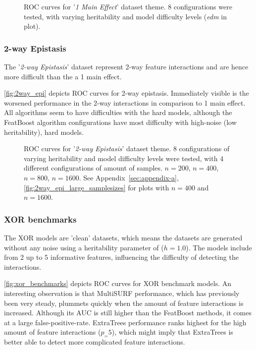 \documentclass{article}
\begin{document}
\begin{figure}[ht]
\centering

\caption{ROC curves for '\textit{1 Main Effect}' dataset theme. 8 configurations were tested, with varying heritability and model difficulty levels (\textit{edm} in plot).}
\label{fig:1_main_effect}
\end{figure}

\subsubsection{2-way Epistasis}
The '\textit{2-way Epistasis}' dataset represent 2-way feature interactions and are hence more difficult than the a 1 main effect.

\autoref{fig:2way_epi} depicts ROC curves for 2-way epistasis. Immediately visible is the worsened performance in the 2-way interactions in comparison to 1 main effect. All algorithms seem to have difficulties with the hard models, although the FeatBoost algorithm configurations have most difficulty with high-noise (low heritability), hard models.

\begin{figure}[ht]
\centering

\caption{ROC curves for '\textit{2-way Epistasis}' dataset theme. 8 configurations of varying heritability and model difficulty levels were tested, with 4 different configurations of amount of samples. $n=200$, $n=400$, $n=800$, $n=1600$. See Appendix~\ref{sec:appendix-a}, \autoref{fig:2way_epi_large_samplesizes} for plots with $n=400$ and $n=1600$.}
\label{fig:2way_epi}
\end{figure}


\subsubsection{XOR benchmarks}
The XOR models are 'clean' datasets, which means the datasets are generated without any noise using a heritability parameter of ($h = 1.0$). The models include from 2 up to 5 informative features, influencing the difficulty of detecting the interactions.

\autoref{fig:xor_benchmarks} depicts ROC curves for XOR benchmark models. An interesting observation is that MultiSURF performance, which has previously been very steady, plummets quickly when the amount of feature interactions is increased. Although its AUC is still higher than the FeatBoost methods, it comes at a large false-positive-rate. ExtraTrees performance ranks highest for the high amount of feature interactions ($p_ = 5$), which might imply that ExtraTrees is better able to detect more complicated feature interactions. 
\end{document}
